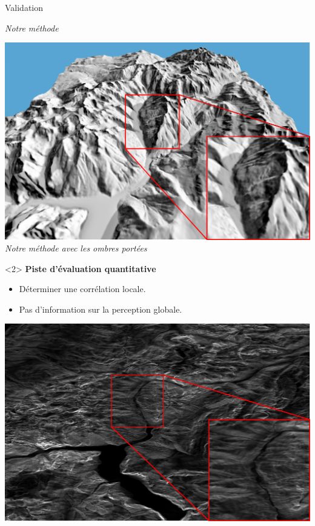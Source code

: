 \documentclass{beamer}
\begin{document}
\begin{frame}[noframenumbering]{Validation}
\begin{onlyenv}
\begin{center}
\begin{minipage}[t]{0.32\linewidth}
\begin{center}
 		\textit{Notre méthode}
    \end{center}
    \end{minipage}
        \begin{minipage}[t]{0.32\linewidth}
    \begin{center}
    	\includegraphics[width=1.0\linewidth]{Resultats/ombre_portee.png}\\
 		\textit{Notre méthode avec les ombres portées}
    \end{center}
    \end{minipage}
    \end{center}
\end{onlyenv}
\begin{onlyenv}<2>
\textbf{Piste d’évaluation quantitative} 
\begin{itemize}
\item Déterminer une corrélation locale.
\item Pas d'information sur la perception globale.
\end{itemize}
\begin{center}
	\begin{minipage}[t]{0.32\linewidth}
    \begin{center}
    	\includegraphics[width=1.0\linewidth]{Resultats/gradient_hauteur.png}\\

\end{center}
\end{minipage}
\end{center}
\end{onlyenv}
\end{frame}
\end{document}
